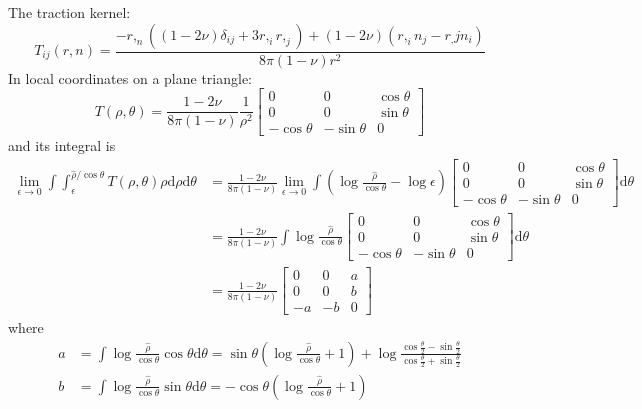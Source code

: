 \documentclass{article}
\newcommand{\td}{\mathrm{d}}
\begin{document}
The traction kernel:
%
\begin{equation}
T_{ij}(r,n) = \frac{-r,_n ((1-2\nu)\delta_{ij} + 3r,_i r,_j) + (1-2\nu) (r,_i n_j - r_,j n_i)}{8\pi(1-\nu)r^2}
\end{equation}
%
In local coordinates on a plane triangle:
%
\begin{equation}
T(\rho,\theta) = 
\frac{1-2\nu}{8\pi(1-\nu)} \frac{1}{\rho^2} \begin{bmatrix}
0 & 0 & \cos\theta \\
0 & 0 & \sin\theta \\
-\cos\theta & -\sin\theta & 0
\end{bmatrix}
\end{equation}
%
and its integral is
%
\begin{align}
\lim_{\epsilon \to 0}\int \int_{\epsilon}^{\hat{\rho}/\cos\theta} T(\rho,\theta) \rho \td \rho \td \theta
&= 
\frac{1-2\nu}{8\pi(1-\nu)}
\lim_{\epsilon\to0}
\int
\left( \log \frac{\hat{\rho}}{\cos\theta} - \log \epsilon \right) \begin{bmatrix}
0 & 0 & \cos\theta \\
0 & 0 & \sin\theta \\
-\cos\theta & -\sin\theta & 0
\end{bmatrix}
\td\theta \nonumber \\
&= 
\frac{1-2\nu}{8\pi(1-\nu)}
\int
\log \frac{\hat{\rho}}{\cos\theta} \begin{bmatrix}
0 & 0 & \cos\theta \\
0 & 0 & \sin\theta \\
-\cos\theta & -\sin\theta & 0
\end{bmatrix}
\td\theta \nonumber \\
&= 
\frac{1-2\nu}{8\pi(1-\nu)}
\begin{bmatrix}
0 & 0 & a \\
0 & 0 & b \\
-a & -b & 0
\end{bmatrix}
\end{align}
%
where
%
\begin{align}
a &= \int \log \frac{\hat{\rho}}{\cos\theta} \cos\theta \td \theta
= \sin\theta \left(  \log \frac{\hat{\rho}}{\cos\theta} + 1\right) + \log \frac{\cos\frac{\theta}{2}-\sin\frac{\theta}{2}}{\cos\frac{\theta}{2}+\sin\frac{\theta}{2}}\\
b &= \int \log \frac{\hat{\rho}}{\cos\theta} \sin\theta \td \theta
=  -\cos\theta \left(  \log \frac{\hat{\rho}}{\cos\theta} + 1\right)
\end{align}
\end{document}
